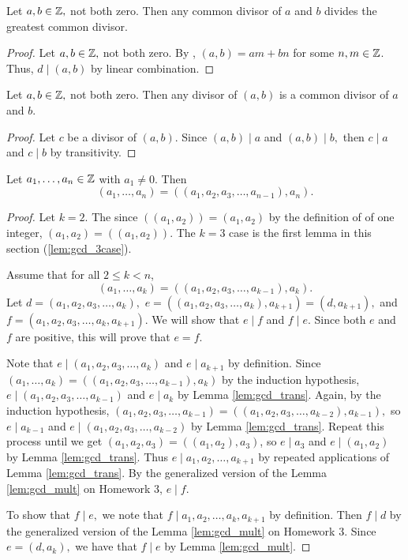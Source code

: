 \documentclass{../ximera}
\begin{document}
\begin{lemma}\label{lem:gcd_mult}
	Let $a,b\in\mathbb Z,$ not both zero. Then any  common divisor of $a$ and $b$ divides the greatest common divisor.
\end{lemma}

 \begin{proof}
 	Let $a,b\in\mathbb Z,$ not both zero. By , $(a,b)=am+bn$ for some $n,m\in\mathbb Z$. Thus, $d\mid (a,b)$ by linear combination.
 \end{proof}

\begin{lemma}\label{lem:gcd_trans}
 	Let $a,b\in\mathbb Z,$ not both zero. Then any divisor of $(a,b)$ is a common divisor of $a$ and $b$.
\end{lemma}

\begin{proof}
 Let $c$ be a divisor of $(a,b)$. Since $(a,b)\mid a$ and $(a,b )\mid b,$ then $c\mid a$ and $c\mid b$ by transitivity.
\end{proof}


\begin{proposition}
 Let $a_1,\dots,a_n\in\mathbb Z$ with $a_1\neq 0$.  Then 
	\[(a_1,\dots,a_n)=((a_1,a_2,a_3,\dots,a_{n-1}),a_n).\]
\end{proposition}
\begin{proof}
 Let $k=2$. The since $((a_1,a_2))=(a_1,a_2)$ by the definition of  of one integer,  $(a_1,a_2)=((a_1,a_2))$. The $k=3$ case is the first lemma in this section (\ref{lem:gcd_3case}).
 
 Assume that for all $2\leq k< n$, 
 	\[(a_1,\dots,a_k)=((a_1,a_2,a_3,\dots,a_{k-1}),a_k).\]
Let $d=(a_1,a_2,a_3,\dots,a_{k}),$
$e=((a_1,a_2,a_3,\dots,a_{k}),a_{k+1})=(d,a_{k+1}),$ and $f= (a_1,a_2,a_3,\dots,a_{k},a_{k+1}).$ We will show that $e\mid f$ and $f\mid e$. Since both $e$ and $f$ are positive, this will prove that $e=f$.

Note that $e\mid (a_1,a_2,a_3,\dots,a_{k})$ and $e\mid a_{k+1}$ by definition. 
Since $(a_1,\dots,a_k)=((a_1,a_2,a_3,\dots,a_{k-1}),a_k)$ by the induction hypothesis, $e\mid(a_1,a_2,a_3,\dots,a_{k-1})$ and $e\mid a_k$ by Lemma \ref{lem:gcd_trans}. Again, by the induction hypothesis, $(a_1,a_2,a_3,\dots,a_{k-1})=((a_1,a_2,a_3,\dots,a_{k-2}),a_{k-1}),$ so $e\mid a_{k-1}$ and $e\mid (a_1,a_2,a_3,\dots,a_{k-2})$ by Lemma \ref{lem:gcd_trans}. Repeat this process until we get $(a_1,a_2,a_3)=((a_1,a_2),a_3)$, so $e\mid a_3$ and $e\mid (a_1,a_2)$ by Lemma \ref{lem:gcd_trans}. Thus $e\mid a_1,a_2,\dots,a_{k+1}$ by repeated applications of Lemma \ref{lem:gcd_trans}. By the generalized version of the Lemma \ref{lem:gcd_mult} on Homework 3, $e\mid f.$

To show that $f\mid e,$ we note that $f\mid a_1,a_2,\dots, a_k,a_{k+1}$ by definition. Then $f\mid d$ by the generalized version of the Lemma \ref{lem:gcd_mult} on Homework 3. Since $e=(d,a_k),$ we have that $f\mid e$ by Lemma \ref{lem:gcd_mult}.
\end{proof} 
\end{document}
